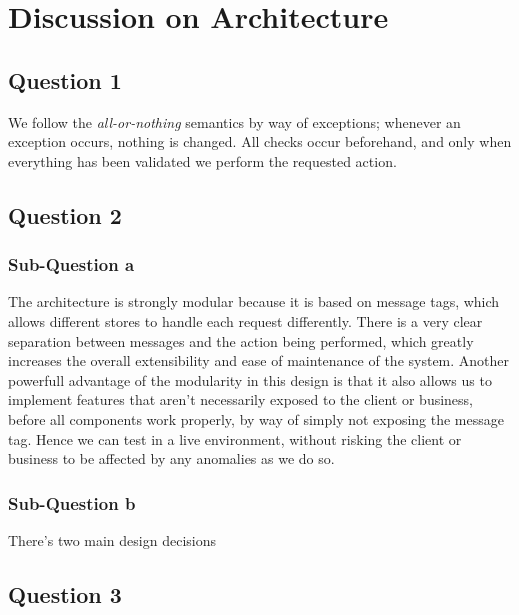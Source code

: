 
\section{Discussion on Architecture}

\subsection{Question 1}
We follow the {\it all-or-nothing} semantics by way of exceptions; whenever an
exception occurs, nothing is changed. All checks occur beforehand, and only when
everything has been validated we perform the requested action.

\subsection{Question 2}

\subsubsection{Sub-Question a}

The architecture is strongly modular because it is based on message tags, which
allows different stores to handle each request differently. There is a very
clear separation between messages and the action being performed, which greatly
increases the overall extensibility and ease of maintenance of the system.
Another powerfull advantage of the modularity in this design is that it also
allows us to implement features that aren't necessarily exposed to the client or
business, before all components work properly, by way of simply not exposing the
message tag. Hence we can test in a live environment, without risking the client
or business to be affected by any anomalies as we do so.

\subsubsection{Sub-Question b}

There's two main design decisions

\subsection{Question 3}

